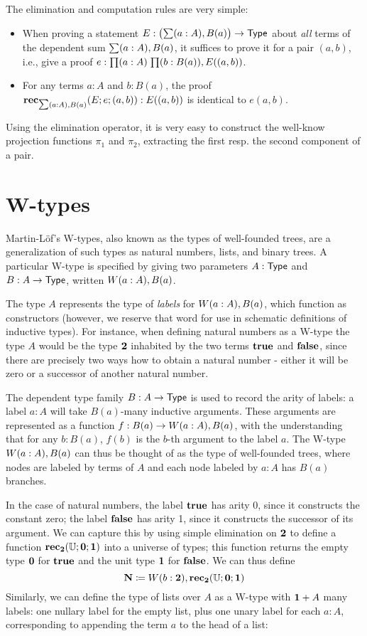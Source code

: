 The elimination and computation rules are very simple:

\begin{itemize}
\item When proving a statement $E : \big(\sm{a:A} B(a)\big) \to \type$ about \emph{all} terms of the dependent sum $\sm{a:A} B(a)$, it suffices to prove it for a pair $(a,b)$, i.e., give a proof $e : \prd{a:A}{b:B(a)} E((a,b))$.
\end{itemize}

\begin{itemize}
\item For any terms $a : A$ and $b : B(a)$, the proof $\rec_{\sm{a:A} B(a)}(E;e;(a,b)) : E((a,b))$ is identical to $e(a,b)$.
\end{itemize}
Using the elimination operator, it is very easy to construct the well-know projection functions $\pi_1$ and $\pi_2$, extracting the first resp. the second component of a pair.

\section{W-types}
Martin-L{\"o}f's W-types, also known as the types of well-founded trees, are a generalization of such types as natural numbers, lists, and binary trees. A particular W-type is specified by giving two parameters $A : \mathsf{Type}$ and $B : A \to \mathsf{Type}$, written $W(a:A), B(a)$.

The type $A$ represents the type of \emph{labels} for $W(a :A), B(a)$, which function as constructors (however, we reserve that word for use in schematic definitions of inductive types). For instance, when defining natural numbers as a W-type the type $A$ would be the type $\mathbf{2}$ inhabited by the two terms $\mathbf{true}$ and $\mathbf{false}$, since there are precisely two ways how to obtain a natural number - either it will be zero or a successor of another natural number. 

The dependent type family $B : A \to \mathsf{Type}$ is used to record the arity of labels: a label $a : A$ will take $B(a)$-many inductive arguments. These arguments are represented as a function $f : B(a) \to W(a :A), B(a)$, with the understanding that for any $b : B(a)$, $f(b)$ is the $b$-th argument to the label $a$. The W-type $W(a :A), B(a)$ can thus be thought of as the type of well-founded trees, where nodes are labeled by terms of $A$ and each node labeled by $a : A$ has $B(a)$ branches.

In the case of natural numbers, the label $\mathbf{true} $ has arity 0, since it constructs the constant zero; the label $\mathbf{false}$ has arity 1, since it constructs the successor of its argument. We can capture this by using simple elimination on $\mathbf{2}$ to define a function $\mathbf{rec}_\mathbf{2}(\mathbb{U};\mathbf{0};\mathbf{1})$ into a universe of types; this function returns the empty type $\mathbf{0}$ for $\mathbf{true}$ and the unit type $\mathbf{1}$ for $\mathbf{false}$. We can thus define
\[ \mathbf{N} \coloneqq W(b:\mathbf{2}), \mathbf{rec}_\mathbf{2}(\mathbb{U};\mathbf{0};\mathbf{1}) \]
Similarly, we can define the type of lists over $A$ as a W-type with $\mathbf{1} + A$ many labels: one nullary label for the empty list, plus one unary label for each $a : A$, corresponding to appending the term $a$ to the head of a list:

